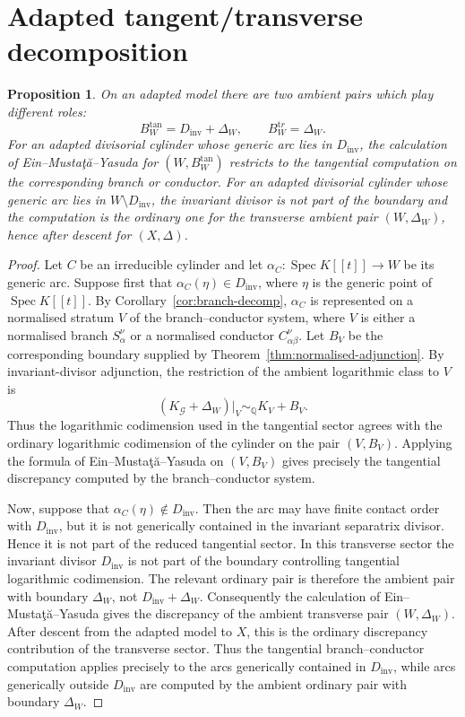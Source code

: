 \documentclass[11pt]{amsart}
\numberwithin{equation}{section}
\theoremstyle{plain}
\newtheorem{Proposition}[Theorem]{Proposition}
\theoremstyle{definition}
\newcommand{\Spec}{\operatorname{Spec}}
\newcommand{\Dinv}{D_{\mathrm{inv}}}
\begin{document}
\section{Adapted tangent/transverse decomposition}
\label{sec:transverse}

\begin{Proposition}
\label{prop:snc-comparison}
On an adapted model there are two ambient pairs which play different roles:
\[
B_W^{\tan}=\Dinv+\Delta_W,
\qquad
B_W^{\mathrm tr}=\Delta_W.
\]
For an adapted divisorial cylinder whose generic arc lies in $\Dinv$, the calculation of Ein--Musta\c{t}\u{a}--Yasuda \cite{EMY} for $(W,B_W^{\tan})$ restricts to the tangential computation on the corresponding branch or conductor.  For an adapted divisorial cylinder whose generic arc lies in $W\setminus \Dinv$, the invariant divisor is not part of the boundary and the computation is the ordinary one for the transverse ambient pair $(W,\Delta_W)$, hence after descent for $(X,\Delta)$.
\end{Proposition}

\begin{proof}
Let \(C\) be an irreducible cylinder and let \(\alpha_C:\Spec K[[t]]\to W\) be its generic arc. Suppose first that \(\alpha_C(\eta)\in \Dinv\), where \(\eta\) is the generic point of \(\Spec K[[t]]\). By Corollary~\ref{cor:branch-decomp}, \(\alpha_C\) is represented on a normalised stratum \(V\) of the branch--conductor system, where \(V\) is either a normalised branch \(S_\alpha^\nu\) or a normalised conductor \(C_{\alpha\beta}^\nu\). Let \(B_V\) be the corresponding boundary supplied by Theorem~\ref{thm:normalised-adjunction}.
By invariant-divisor adjunction, the restriction of the ambient logarithmic class to \(V\) is
\[
(K_{\mathcal G}+\Delta_W)|_V\sim_{\mathbb Q} K_V+B_V.
\]
Thus the logarithmic codimension used in the tangential sector agrees with the ordinary logarithmic codimension of the cylinder on the pair \((V,B_V)\). Applying the formula of Ein--Musta\c{t}\u{a}--Yasuda \cite{EMY} on \((V,B_V)\) gives precisely the tangential discrepancy computed by the branch--conductor system.

Now, suppose that \(\alpha_C(\eta)\notin \Dinv\). Then the arc may have finite contact order with \(\Dinv\), but it is not generically contained in the invariant separatrix divisor. Hence it is not part of the reduced tangential sector. In this transverse sector the invariant divisor \(\Dinv\) is not part of the boundary controlling tangential logarithmic codimension. The relevant ordinary pair is therefore the ambient pair with boundary \(\Delta_W\), not \(\Dinv+\Delta_W\).
Consequently the calculation of Ein--Musta\c{t}\u{a}--Yasuda \cite{EMY} gives the discrepancy of the ambient transverse pair \((W,\Delta_W)\). After descent from the adapted model to \(X\), this is the ordinary discrepancy contribution of the transverse sector. Thus the tangential branch--conductor computation applies precisely to the arcs generically contained in \(\Dinv\), while arcs generically outside \(\Dinv\) are computed by the ambient ordinary pair with boundary \(\Delta_W\).
\end{proof}
\end{document}
